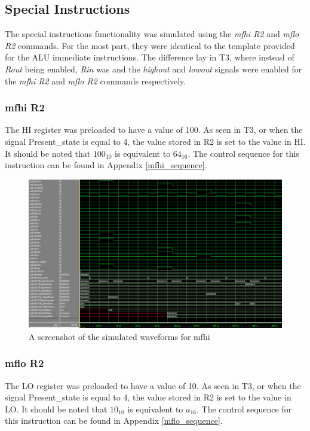 \documentclass{article}
\begin{document}
    \subsection{Special Instructions}
    The special instructions functionality was simulated using the \emph{mfhi R2} and \emph{mflo R2} commands. For the most part, they were identical to the template provided for the ALU immediate instructions. The difference lay in T3, where instead of \emph{Rout} being enabled, \emph{Rin} was and the \emph{highout} and \emph{lowout} signals were enabled for the \emph{mfhi R2} and \emph{mflo R2} commands respectively. 
    
        \subsubsection{mfhi R2}
            The HI register was preloaded to have a value of 100. As seen in T3, or when the signal Present\_state is equal to 4, the value stored in R2 is set to the value in HI. It should be noted that $100_{10}$ is equivalent to $64_{16}$. The control sequence for this instruction can be found in Appendix \ref{mfhi_sequence}.

                \begin{figure}[h!]
                    \begin{center}
                        \includegraphics[width=15cm]{mfhi_wave.png}
                        \caption{A screenshot of the simulated waveforms for mfhi}
                    \end{center}
                \end{figure}

        \subsubsection{mflo R2}
            The LO register was preloaded to have a value of 10. As seen in T3, or when the signal Present\_state is equal to 4, the value stored in R2 is set to the value in LO. It should be noted that $10_{10}$ is equivalent to $a_{16}$. The control sequence for this instruction can be found in Appendix \ref{mflo_sequence}.
      
\end{document}
